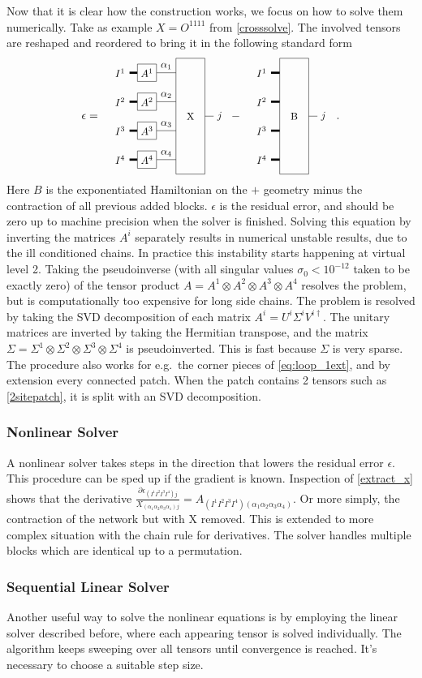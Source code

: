\documentclass[twocolumn]{article}
\newcounter{a}
\newcounter{b}
\begin{document}
Now that it is clear how  the construction works, we focus on how to solve them numerically. Take as example  $X=O^{1 1 1 1}$ from \cref{crosssolve}. The involved tensors are reshaped and reordered to bring it in the following standard form
\begin{equation} \label{extract_x}
    \epsilon =  \vcenter{\hbox{  \scalebox{0.9}{ \pepoct }} } - \vcenter{\hbox{  \scalebox{0.9}{ \blockct } }} .
\end{equation}
Here $B$ is the exponentiated Hamiltonian on the $+$ geometry minus the contraction of all previous added blocks. $\epsilon$ is the residual error, and should be zero up to machine precision when the solver is finished. Solving this equation by inverting the matrices $A^i$ separately results in numerical unstable results, due to the ill conditioned chains. In practice this instability starts happening at virtual level 2. Taking the pseudoinverse (with all singular values $\sigma_0<10^{-12}$ taken to be exactly zero) of the tensor product  $A = A^1 \otimes A^2 \otimes A^3 \otimes A^4$  resolves the problem, but is  computationally too expensive for long side chains. The problem is resolved by taking the SVD decomposition of each matrix $A^i = U^i \Sigma^i V^{i \dagger}$. The unitary matrices are inverted by taking the Hermitian transpose, and the matrix $\Sigma = \Sigma^1 \otimes \Sigma^2 \otimes \Sigma^3 \otimes \Sigma^4$ is pseudoinverted. This is fast because $\Sigma$ is very sparse. The procedure also works for e.g.\ the corner pieces of \cref{eq:loop_1ext}, and by extension every connected patch. When the patch contains 2 tensors such as \cref{2sitepatch}, it is split with an SVD decomposition.

\subsubsection{Nonlinear Solver}
A nonlinear solver takes steps in the direction that lowers the residual error $\epsilon$. This procedure can be sped up if the gradient is known. Inspection of \cref{extract_x} shows that the derivative  $\frac{\partial  \epsilon_{ (I^1 I^2 I^3 I^4) j }  }  { X_{ (\alpha_1 \alpha_2 \alpha_3 \alpha_1)  j } }   = A_{ (I^1 I^2 I^3 I^4) (\alpha_1 \alpha_2 \alpha_3 \alpha_4) } $. Or more simply, the contraction of the network but with X removed. This is extended to more complex situation with the chain rule for derivatives. The solver handles multiple blocks which are identical up to a permutation.

\subsubsection{Sequential Linear Solver}
Another useful way to solve the nonlinear equations is by employing the linear solver described before, where each appearing tensor is solved individually. The algorithm keeps sweeping over all tensors until convergence is reached. It's necessary to choose a suitable step size.
\end{document}
